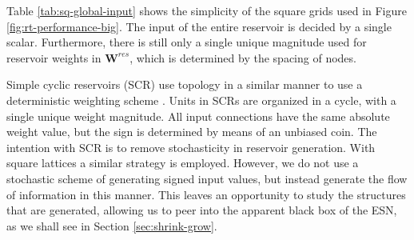 Table \ref{tab:sq-global-input} shows the simplicity of the square grids used in
Figure \ref{fig:rt-performance-big}. The input of the entire reservoir is
decided by a single scalar. Furthermore, there is still only a single unique
magnitude used for reservoir weights in $\mathbf{W}^{res}$, which is determined
by the spacing of nodes.

Simple cyclic reservoirs (SCR) use topology in a similar manner to use a
deterministic weighting scheme \cite{rodan_minimum_2011}. Units in SCRs are
organized in a cycle, with a single unique weight magnitude. All input
connections have the same absolute weight value, but the sign is determined by
means of an unbiased coin. The intention with SCR is to remove stochasticity in
reservoir generation. With square lattices a similar strategy is
employed. However, we do not use a stochastic scheme of generating signed input
values, but instead generate the flow of information in this manner. This leaves
an opportunity to study the structures that are generated, allowing us to peer
into the apparent black box of the ESN, as we shall see in Section
\ref{sec:shrink-grow}.

